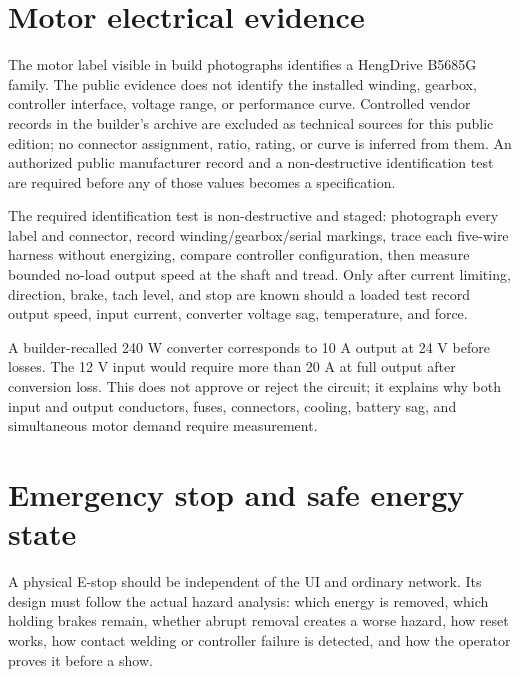 \documentclass[10pt,openany]{book}
\begin{document}
\section{Motor electrical evidence}

The motor label visible in build photographs identifies a HengDrive B5685G family. The public evidence does not identify the installed winding, gearbox, controller interface, voltage range, or performance curve. Controlled vendor records in the builder's archive are excluded as technical sources for this public edition; no connector assignment, ratio, rating, or curve is inferred from them. An authorized public manufacturer record and a non-destructive identification test are required before any of those values becomes a specification.

The required identification test is non-destructive and staged: photograph every label and connector, record winding/gearbox/serial markings, trace each five-wire harness without energizing, compare controller configuration, then measure bounded no-load output speed at the shaft and tread. Only after current limiting, direction, brake, tach level, and stop are known should a loaded test record output speed, input current, converter voltage sag, temperature, and force.

\begin{advancedbox}
A builder-recalled 240 W converter corresponds to 10 A output at 24 V before losses. The 12 V input would require more than 20 A at full output after conversion loss. This does not approve or reject the circuit; it explains why both input and output conductors, fuses, connectors, cooling, battery sag, and simultaneous motor demand require measurement.
\end{advancedbox}

\section{Emergency stop and safe energy state}

A physical E-stop should be independent of the UI and ordinary network. Its design must follow the actual hazard analysis: which energy is removed, which holding brakes remain, whether abrupt removal creates a worse hazard, how reset works, how contact welding or controller failure is detected, and how the operator proves it before a show.

\end{document}

